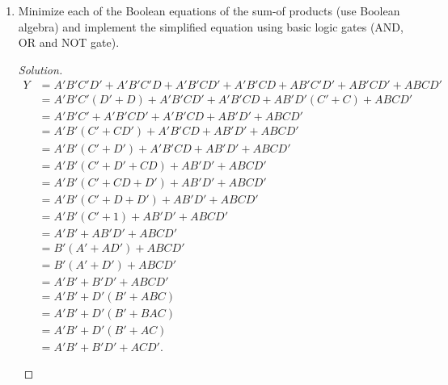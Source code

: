 \documentclass{zc-ust-hw}
\newenvironment{solution}
  {\renewcommand\qedsymbol{$\blacksquare$}\begin{proof}[Solution]}
  {\end{proof}}
\begin{document}
\begin{enumerate}
\begin{enumerate}[label=\alph*.]
\begin{solution}
\begin{align}
            Y &=
            \begin{array}{l}
              (A+B'+C+D)(A+B'+C+D')(A+B'+C+D')(A+B'+C'+D) \\
              (A+B'+C'+D')(A'+B+C+D')(A'+B+C'+D')(A'+B'+C+D) \\
              (A'+B'+C+D') (A'+B'+C'+D')
            \end{array}\\
              &= \Pi(4,5,6,7,9,11,12,13,15)
          .\end{align}
        \end{solution}
        \newpage
      \item Minimize each of the Boolean equations of the sum-of products (use
        Boolean algebra) and implement the simplified equation using basic
        logic gates (AND, OR and NOT gate). 
        \begin{solution}
          \begin{align}
            Y &= A'B'C'D'+A'B'C'D+A'B'CD'+A'B'CD+AB'C'D'+AB'CD'+ABCD' \\
              &= A'B'C'(D'+D)+A'B'CD'+A'B'CD+AB'D'(C'+C)+ABCD' \\
              &= A'B'C'+A'B'CD'+A'B'CD+AB'D'+ABCD' \\
              &= A'B'(C'+CD')+A'B'CD+AB'D'+ABCD' \\
              &= A'B'(C'+D')+A'B'CD+AB'D'+ABCD' \\
              &= A'B'(C'+D'+CD)+AB'D'+ABCD' \\
              &= A'B'(C'+CD+D')+AB'D'+ABCD' \\
              &= A'B'(C'+D+D')+AB'D'+ABCD' \\
              &= A'B'(C'+1)+AB'D'+ABCD' \\
              &= A'B'+AB'D'+ABCD' \\
              &= B'(A'+AD')+ABCD' \\
              &= B'(A'+D')+ABCD' \\
              &= A'B' + B'D' + ABCD' \\
              &= A'B' + D'(B' + ABC) \\
              &= A'B' + D'(B' + BAC) \\
              &= A'B' + D'(B' + AC) \\
              &= A'B' + B'D' + ACD'
          .\end{align}
          \begin{figure}[htpb]
            \begin{center}

\end{center}
\end{figure}
\end{solution}
\end{enumerate}
\end{enumerate}
\end{document}
